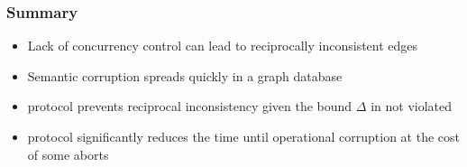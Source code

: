 \begin{frame}
  \frametitle{Summary}
  \begin{itemize}
  \item Lack of concurrency control can lead to reciprocally inconsistent edges
  \item Semantic corruption spreads quickly in a graph database
  \item \tDelta protocol prevents reciprocal inconsistency given the bound $\Delta$ in not violated
  \item \tDelta protocol significantly reduces the time until operational corruption at the cost of some aborts
  \end{itemize}
\end{frame}